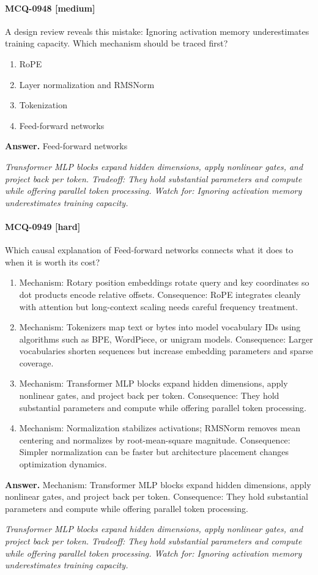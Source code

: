 \paragraph{MCQ-0948 [medium]} A design review reveals this mistake: Ignoring activation memory underestimates training capacity. Which mechanism should be traced first?
\begin{enumerate}[label=\Alph*.]
\item RoPE
\item Layer normalization and RMSNorm
\item Tokenization
\item Feed-forward networks
\end{enumerate}
\noindent\textbf{Answer.} Feed-forward networks
\par\textit{Transformer MLP blocks expand hidden dimensions, apply nonlinear gates, and project back per token. Tradeoff: They hold substantial parameters and compute while offering parallel token processing. Watch for: Ignoring activation memory underestimates training capacity.}
\paragraph{MCQ-0949 [hard]} Which causal explanation of Feed-forward networks connects what it does to when it is worth its cost?
\begin{enumerate}[label=\Alph*.]
\item Mechanism: Rotary position embeddings rotate query and key coordinates so dot products encode relative offsets. Consequence: RoPE integrates cleanly with attention but long-context scaling needs careful frequency treatment.
\item Mechanism: Tokenizers map text or bytes into model vocabulary IDs using algorithms such as BPE, WordPiece, or unigram models. Consequence: Larger vocabularies shorten sequences but increase embedding parameters and sparse coverage.
\item Mechanism: Transformer MLP blocks expand hidden dimensions, apply nonlinear gates, and project back per token. Consequence: They hold substantial parameters and compute while offering parallel token processing.
\item Mechanism: Normalization stabilizes activations; RMSNorm removes mean centering and normalizes by root-mean-square magnitude. Consequence: Simpler normalization can be faster but architecture placement changes optimization dynamics.
\end{enumerate}
\noindent\textbf{Answer.} Mechanism: Transformer MLP blocks expand hidden dimensions, apply nonlinear gates, and project back per token. Consequence: They hold substantial parameters and compute while offering parallel token processing.
\par\textit{Transformer MLP blocks expand hidden dimensions, apply nonlinear gates, and project back per token. Tradeoff: They hold substantial parameters and compute while offering parallel token processing. Watch for: Ignoring activation memory underestimates training capacity.}

